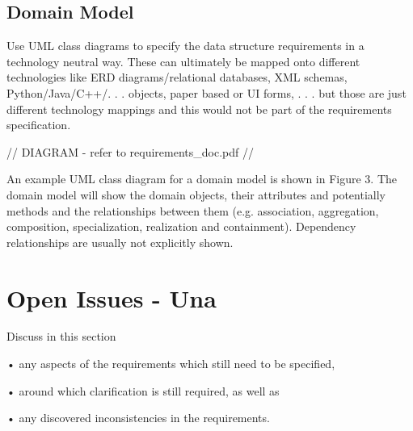 \documentclass{scrreprt}
\begin{document}
\section{Domain Model}
Use UML class diagrams to specify the data structure requirements in a technology neutral way. These can ultimately be mapped onto different technologies like ERD diagrams/relational databases, XML schemas, Python/Java/C++/. . . objects, paper based or UI forms, . . . but those are just different technology mappings and this would not be part of the requirements specification.

// DIAGRAM - refer to requirements_doc.pdf //

An example UML class diagram for a domain model is shown in Figure 3.
The domain model will show the domain objects, their attributes and potentially methods and the relationships between them (e.g. association, aggregation, composition, specialization, realization and containment). Dependency relationships are usually not explicitly shown.

\chapter{Open Issues - Una}
Discuss in this section

• any aspects of the requirements which still need to be specified, 

• around which clarification is still required, as well as

• any discovered inconsistencies in the requirements.
\end{document}
